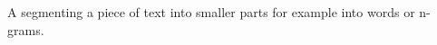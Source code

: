 \documentclass[a4paper]{article}
\title{}
\date{}
\begin{document}
    \maketitle
    A segmenting a piece of text into smaller parts for example into words or n-grams.
\end{document}
